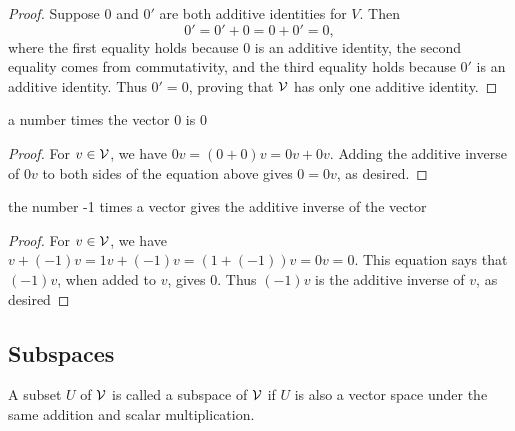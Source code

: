 \begin{proof}
	Suppose $0$ and $0'$ are both additive identities for $V$. Then
	\[ 0' = 0' + 0 = 0 + 0' = 0, \]
	where the first equality holds because 0 is an additive identity, the second equality
	comes from commutativity, and the third equality holds because $0'$ is an additive
	identity. Thus $0' = 0$, proving that $\mathcal{V}$ has only one additive identity.
\end{proof}
\begin{theorem}
	a number times the vector 0 is 0
\end{theorem}
\begin{proof}
	For $v \in \mathcal{V}$, we have
	$0v = (0 + 0)v = 0v + 0v$.
	Adding the additive inverse of $0v$ to both
	sides of the equation above gives $0 = 0v$,
	as desired.
\end{proof}
\begin{theorem}
	the number -1 times a vector gives the additive inverse of the vector
\end{theorem}
\begin{proof}
	For $v \in \mathcal{V}$, we have
	$v + (-1)v = 1v + (-1)v = (1 + (-1))v = 0v = 0$.
	This equation says that $(-1)v$, when added to $v$, gives 0. Thus $(-1)v$ is the
	additive inverse of $v$, as desired
\end{proof}
\subsection{Subspaces}
\begin{definition}[Subspace]
	A subset $U$ of $\mathcal{V}$ is called a subspace of $\mathcal{V}$ if $U$ is also a vector space under the same addition and scalar multiplication.
\end{definition}
